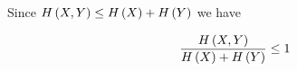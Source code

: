 \documentclass[ClusteringConnectionsMAIN.tex]{subfiles}
\begin{document}
	

  Since $H \left( X, Y \right) \leq H \left( X \right) + H \left( Y \right)$ we have

\begin{align}
\frac{ H \left(  X, Y  \right) }{ H \left( X \right) + H \left( Y \right) } \leq 1   \notag
\end{align}
\end{document}
